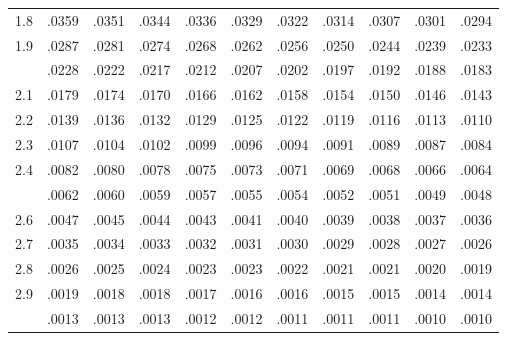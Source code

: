 \begin{tabular}{c|*{10}{c}}
  1.8 & .0359 & .0351 & .0344 & .0336 & .0329 & .0322 & .0314 & .0307 & .0301 & .0294 \\
  1.9 & .0287 & .0281 & .0274 & .0268 & .0262 & .0256 & .0250 & .0244 & .0239 & .0233 \\
  \addlinespace[2pt]
  2.0 & .0228 & .0222 & .0217 & .0212 & .0207 & .0202 & .0197 & .0192 & .0188 & .0183 \\
  2.1 & .0179 & .0174 & .0170 & .0166 & .0162 & .0158 & .0154 & .0150 & .0146 & .0143 \\
  2.2 & .0139 & .0136 & .0132 & .0129 & .0125 & .0122 & .0119 & .0116 & .0113 & .0110 \\
  2.3 & .0107 & .0104 & .0102 & .0099 & .0096 & .0094 & .0091 & .0089 & .0087 & .0084 \\
  2.4 & .0082 & .0080 & .0078 & .0075 & .0073 & .0071 & .0069 & .0068 & .0066 & .0064 \\
  \addlinespace[2pt]
  2.5 & .0062 & .0060 & .0059 & .0057 & .0055 & .0054 & .0052 & .0051 & .0049 & .0048 \\
  2.6 & .0047 & .0045 & .0044 & .0043 & .0041 & .0040 & .0039 & .0038 & .0037 & .0036 \\
  2.7 & .0035 & .0034 & .0033 & .0032 & .0031 & .0030 & .0029 & .0028 & .0027 & .0026 \\
  2.8 & .0026 & .0025 & .0024 & .0023 & .0023 & .0022 & .0021 & .0021 & .0020 & .0019 \\
  2.9 & .0019 & .0018 & .0018 & .0017 & .0016 & .0016 & .0015 & .0015 & .0014 & .0014 \\
  \addlinespace[2pt]
  3.0 & .0013 & .0013 & .0013 & .0012 & .0012 & .0011 & .0011 & .0011 & .0010 & .0010 \\
  \bottomrule
\end{tabular}
